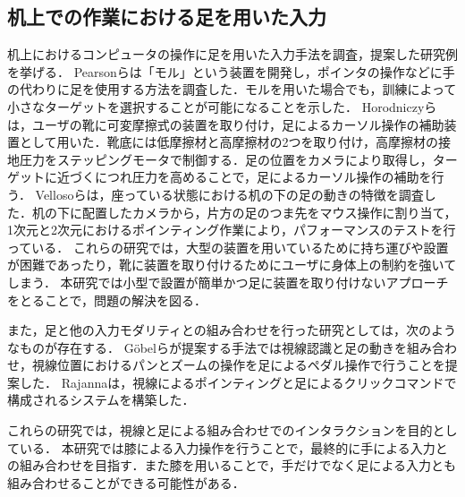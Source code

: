 \documentclass[submit, techrep]{ipsj}
\begin{document}
\subsection{机上での作業における足を用いた入力}
机上におけるコンピュータの操作に足を用いた入力手法を調査，提案した研究例を挙げる．
Pearsonら\cite{Pearson:1986:MMD:22627.22392, Pearson:1988:EEP:57167.57169}は「モル」という装置を開発し，ポインタの操作などに手の代わりに足を使用する方法を調査した．モルを用いた場合でも，訓練によって小さなターゲットを選択することが可能になることを示した．
Horodniczyら\cite{Horodniczy:2017:FHE:3025453.3025625}は，ユーザの靴に可変摩擦式の装置を取り付け，足によるカーソル操作の補助装置として用いた．靴底には低摩擦材と高摩擦材の2つを取り付け，高摩擦材の接地圧力をステッピングモータで制御する．足の位置をカメラにより取得し，ターゲットに近づくにつれ圧力を高めることで，足によるカーソル操作の補助を行う．
Vellosoら\cite{velloso:hal-01599657}は，座っている状態における机の下の足の動きの特徴を調査した．机の下に配置したカメラから，片方の足のつま先をマウス操作に割り当て，1次元と2次元におけるポインティング作業により，パフォーマンスのテストを行っている．
これらの研究では，大型の装置を用いているために持ち運びや設置が困難であったり，靴に装置を取り付けるためにユーザに身体上の制約を強いてしまう．
本研究では小型で設置が簡単かつ足に装置を取り付けないアプローチをとることで，問題の解決を図る．\par
また，足と他の入力モダリティとの組み合わせを行った研究としては，次のようなものが存在する．
G\"{o}belら\cite{Gobel:2013:GFI:2468356.2479610}が提案する手法では視線認識と足の動きを組み合わせ，視線位置におけるパンとズームの操作を足によるペダル操作で行うことを提案した．
Rajanna\cite{Rajanna:2016:GFI:2876456.2876462}は，視線によるポインティングと足によるクリックコマンドで構成されるシステムを構築した．\par
これらの研究では，視線と足による組み合わせでのインタラクションを目的としている．
本研究では膝による入力操作を行うことで，最終的に手による入力との組み合わせを目指す．また膝を用いることで，手だけでなく足による入力とも組み合わせることができる可能性がある．
\end{document}
